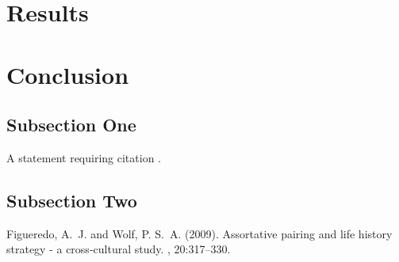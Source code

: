 \documentclass[twoside,twocolumn]{article}
\begin{document}
\section{Results}

\blindtext %


\section{Conclusion}

\subsection{Subsection One}

A statement requiring citation \cite{Figueredo:2009dg}.
\blindtext %

\subsection{Subsection Two}

\blindtext %


\begin{thebibliography}{99} %

Figueredo, A.~J. and Wolf, P. S.~A. (2009).
\newblock Assortative pairing and life history strategy - a cross-cultural
  study.
, 20:317--330.
 
\end{thebibliography}

\end{document}
